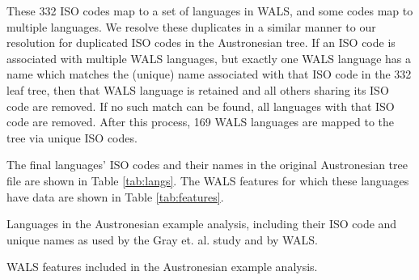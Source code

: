 \documentclass[article,10pt]{scrartcl}
\begin{document}
These 332 ISO codes map to a set of languages in WALS, and some codes map to multiple languages.  We resolve these duplicates in a similar manner to our resolution for duplicated ISO codes in the Austronesian tree.  If an ISO code is associated with multiple WALS languages, but exactly one WALS language has a name which matches the (unique) name associated with that ISO code in the 332 leaf tree, then that WALS language is retained and all others sharing its ISO code are removed.  If no such match can be found, all languages with that ISO code are removed.  After this process, 169 WALS languages are mapped to the tree via unique ISO codes.

The final languages' ISO codes and their names in the original Austronesian tree file are shown in Table \ref{tab:langs}.  The WALS features for which these languages have data are shown in Table \ref{tab:features}.

\begin{table}[]
	\begin{center}
	\tiny
	
	\end{center}
	\caption{Languages in the Austronesian example analysis, including their ISO code and unique names as used by the Gray et. al. study and by WALS.}
\label{tab:langs}
\end{table}

\begin{table}[ht]
	\begin{center}
		
	\end{center}
\caption{WALS features included in the Austronesian example analysis.}
\label{tab:features}
\end{table}
\end{document}
